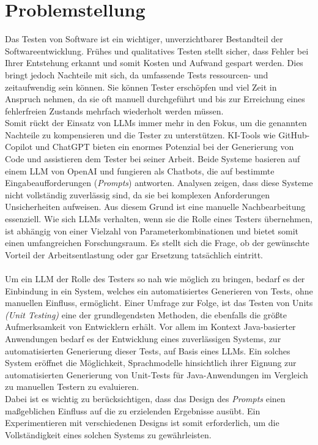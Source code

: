 \section{Problemstellung}
Das Testen von Software ist ein wichtiger, unverzichtbarer Bestandteil der Softwareentwicklung. Frühes und qualitatives Testen stellt sicher, dass Fehler bei Ihrer Entstehung erkannt und somit Kosten und Aufwand gespart werden. Dies bringt jedoch Nachteile mit sich, da umfassende Tests ressourcen- und zeitaufwendig sein können. Sie können Tester erschöpfen und viel Zeit in Anspruch nehmen, da sie oft manuell durchgeführt und bis zur Erreichung eines fehlerfreien Zustands mehrfach wiederholt werden müssen. \cite{pargaonkar_study_2023}\\ Somit rückt der Einsatz von LLMs immer mehr in den Fokus, um die genannten Nachteile zu kompensieren und die Tester zu unterstützen. KI-Tools wie GitHub-Copilot und ChatGPT bieten ein enormes Potenzial bei der Generierung von Code und assistieren dem Tester bei seiner Arbeit. Beide Systeme basieren auf einem LLM von OpenAI und fungieren als Chatbots, die auf bestimmte Eingabeaufforderungen (\textit{Prompts}) antworten. Analysen zeigen, dass diese Systeme nicht vollständig zuverlässig sind, da sie bei komplexen Anforderungen Unsicherheiten aufweisen. \cite{poldrack_ai-assisted_2023} Aus diesem Grund ist eine manuelle Nachbearbeitung essenziell. Wie sich LLMs verhalten, wenn sie die Rolle eines Testers übernehmen, ist abhängig von einer Vielzahl von Parameterkombinationen und bietet somit einen umfangreichen Forschungsraum. Es stellt sich die Frage, ob der gewünschte Vorteil der Arbeitsentlastung oder gar Ersetzung tatsächlich eintritt.\\\\ Um ein LLM der Rolle des Testers so nah wie möglich zu bringen, bedarf es der Einbindung in ein System, welches ein automatisiertes Generieren von Tests, ohne manuellen Einfluss, ermöglicht. Einer Umfrage zur Folge, ist das Testen von Units \textit{(Unit Testing)} eine der grundlegendsten Methoden, die ebenfalls die größte Aufmerksamkeit von Entwicklern erhält. \cite{garousi_survey_2013} Vor allem im Kontext Java-basierter Anwendungen bedarf es der Entwicklung eines zuverlässigen Systems, zur automatisierten Generierung dieser Tests, auf Basis eines LLMs. Ein solches System eröffnet die Möglichkeit, Sprachmodelle hinsichtlich ihrer Eignung zur automatisierten Generierung von Unit-Tests für Java-Anwendungen im Vergleich zu manuellen Testern zu evaluieren.\\ Dabei ist es wichtig zu berücksichtigen, dass das Design des \textit{Prompts} einen maßgeblichen Einfluss auf die zu erzielenden Ergebnisse ausübt. Ein Experimentieren mit verschiedenen Designs ist somit erforderlich, um die Vollständigkeit eines solchen Systems zu gewährleisten.


